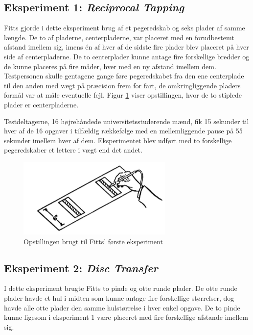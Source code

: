 \subsection*{Eksperiment 1: \textit{Reciprocal Tapping}}
Fitts gjorde i dette eksperiment brug af et pegeredskab og seks plader af samme længde. De to af pladerne, centerpladerne, var placeret med en forudbestemt afstand imellem sig, imens én af hver af de sidste fire plader blev placeret på hver side af centerpladerne. De to centerplader kunne antage fire forskellige bredder og de kunne placeres på fire måder, hver med en ny afstand imellem dem. Testpersonen skulle gentagene gange føre pegeredskabet fra den ene centerplade til den anden med vægt på præcision frem for fart, de omkringliggende pladers formål var at måle eventuelle fejl. Figur \ref{fig:FittsEx1} viser opstillingen, hvor de to stiplede plader er centerpladerne.

Testdeltagerne, 16 højrehåndede universitetsstuderende mænd, fik 15 sekunder til hver af de 16 opgaver i tilfældig rækkefølge med en mellemliggende pause på 55 sekunder imellem hver af dem. Eksperimentet blev udført med to forskellige pegeredskaber et lettere i vægt end det andet.

\begin{figure}[h]
\centering
\includegraphics{images/illustrations/fitt_ex1}
\caption{Opstillingen brugt til Fitts' første eksperiment \cite{fitts1954}}
  \label{fig:FittsEx1}
\end{figure}

\subsection*{Eksperiment 2: \textit{Disc Transfer}}
I dette eksperiment brugte Fitts to pinde og otte runde plader. De otte runde plader havde et hul i midten som kunne antage fire forskellige størrelser, dog havde alle otte plader den samme hulstørrelse i hver enkel opgave. De to pinde kunne ligesom i eksperiment 1 være placeret med fire forskellige afstande imellem sig. 

